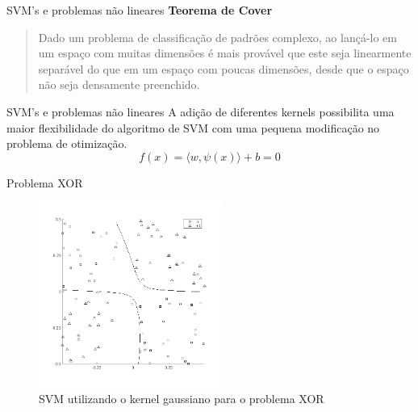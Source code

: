 \documentclass[10pt]{beamer}
\begin{document}
\begin{frame}{SVM's e problemas não lineares}
    \textbf{Teorema de Cover}
    \begin{quote}
      Dado um problema de classificação de padrões complexo, ao lançá-lo em 
      um espaço com muitas dimensões é mais provável que este seja linearmente 
      separável do que em um espaço com poucas dimensões, desde que o espaço não seja densamente preenchido.
      \cite{haykin_neural_2010}
    \end{quote}
\end{frame}

\begin{frame} {SVM's e problemas não lineares}
  A adição de diferentes kernels possibilita uma maior flexibilidade do algoritmo de
  SVM com uma pequena modificação no problema de otimização.
  \begin{equation}
    f(x) = \langle w, \psi(x) \rangle + b = 0
    \nonumber
  \end{equation}
\end{frame}

\begin{frame}{Problema XOR}
  \begin{figure}
    \centering
    \includegraphics[width=6cm]{images/svmXor.png}
    \caption{SVM utilizando o kernel gaussiano para o problema XOR}
  \end{figure}
\end{frame}
\end{document}
